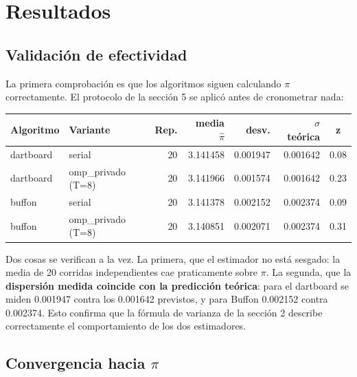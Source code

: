 \section{Resultados}

\subsection{Validación de efectividad}

La primera comprobación es que los algoritmos siguen calculando $\pi$ correctamente. El protocolo de la sección 5 se aplicó antes de cronometrar nada:

\begin{center}
\small
\begin{tabular}{|l|l|r|r|r|r|c|}
\hline
\textbf{Algoritmo} & \textbf{Variante} & \textbf{Rep.} & \textbf{media $\hat\pi$} & \textbf{desv.} & \textbf{$\sigma$ teórica} & \textbf{z} \\
\hline
dartboard & serial & 20 & 3.141458 & 0.001947 & 0.001642 & 0.08 \\
dartboard & omp\_privado (T=8) & 20 & 3.141966 & 0.001574 & 0.001642 & 0.23 \\
buffon & serial & 20 & 3.141378 & 0.002152 & 0.002374 & 0.09 \\
buffon & omp\_privado (T=8) & 20 & 3.140851 & 0.002071 & 0.002374 & 0.31 \\
\hline
\end{tabular}
\caption{Test de efectividad con $N = 10^6$. Todas las medias están a menos de $0.4\sigma$ teóricas del valor real de $\pi$, y la desviación medida coincide con la teórica.}
\label{tab:validacion}
\end{center}

Dos cosas se verifican a la vez. La primera, que el estimador no está sesgado: la media de 20 corridas independientes cae praticamente sobre $\pi$. La segunda, que la \textbf{dispersión medida coincide con la predicción teórica}: para el dartboard se miden 0.001947 contra los 0.001642 previstos, y para Buffon 0.002152 contra 0.002374. Esto confirma que la fórmula de varianza de la sección 2 describe correctamente el comportamiento de los dos estimadores.

\subsection{Convergencia hacia $\pi$}

